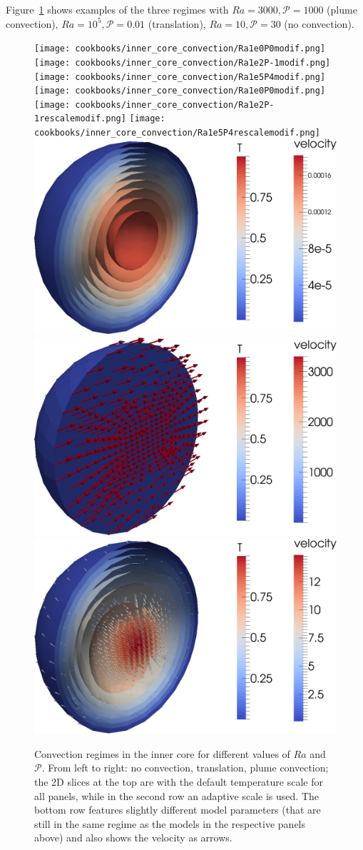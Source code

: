 \documentclass{article}
\begin{document}
Figure~\ref{fig:inner-core-regimes} shows examples of the three regimes with $Ra=3000, \mathcal{P}=1000$ (plume convection), 
$Ra=10^5, \mathcal{P}=0.01$ (translation), $Ra=10, \mathcal{P}=30$ (no convection).

\begin{figure}[h]
    \begin{center}
    \texttt{[image: cookbooks/inner\_core\_convection/Ra1e0P0modif.png]}
    \texttt{[image: cookbooks/inner\_core\_convection/Ra1e2P-1modif.png]}
    \texttt{[image: cookbooks/inner\_core\_convection/Ra1e5P4modif.png]}
   \vspace{1cm}
    \texttt{[image: cookbooks/inner\_core\_convection/Ra1e0P0modif.png]}
    \texttt{[image: cookbooks/inner\_core\_convection/Ra1e2P-1rescalemodif.png]}
    \texttt{[image: cookbooks/inner\_core\_convection/Ra1e5P4rescalemodif.png]}
   \vspace{1cm}
    \includegraphics[width=0.25\linewidth]{cookbooks/inner_core_convection/no_convection.png}
    \includegraphics[width=0.25\linewidth]{cookbooks/inner_core_convection/translation.png}
    \includegraphics[width=0.25\linewidth]{cookbooks/inner_core_convection/convection.png}
    \caption{Convection regimes in the inner core for different values of $Ra$ and $\mathcal{P}$. From left to right: no convection, translation, plume convection; the 2D slices at the top are with the default temperature scale for all panels, while in the second row an adaptive scale is used. The bottom row features slightly different model parameters (that are still in the same regime as the models in the respective panels above) and also shows the velocity as arrows.}
    \label{fig:inner-core-regimes}
       \end{center}
\end{figure}
\end{document}
